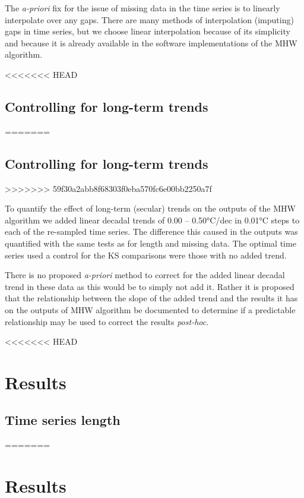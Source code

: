 \documentclass[]{article}
\begin{document}
{The \emph{a-priori} fix for the issue of missing data in the time series
is to linearly interpolate over any gaps. There are many methods of
interpolation (imputing) gaps in time series, but we choose linear
interpolation because of its simplicity and because it is already
available in the software implementations of the MHW algorithm.

<<<<<<< HEAD
\hypertarget{controlling-for-long-term-trends}{%
\subsection{Controlling for long-term
trends}\label{controlling-for-long-term-trends}}
=======
\subsection{Controlling for long-term
trends}\label{controlling-for-long-term-trends}
>>>>>>> 59f30a2abb8f68303f0eba570fc6e00bb2250a7f

To quantify the effect of long-term (secular) trends on the outputs of
the MHW algorithm we added linear decadal trends of 0.00 -- 0.50°C/dec
in 0.01°C steps to each of the re-sampled time series. The difference
this caused in the outputs was quantified with the same tests as for
length and missing data. The optimal time series used a control for the
KS comparisons were those with no added trend.

There is no proposed \emph{a-priori} method to correct for the added
linear decadal trend in these data as this would be to simply not add
it. Rather it is proposed that the relationship between the slope of the
added trend and the results it has on the outputs of MHW algorithm be
documented to determine if a predictable relationship may be used to
correct the results \emph{post-hoc}.

<<<<<<< HEAD
\hypertarget{results}{%
\section{Results}\label{results}}

\hypertarget{time-series-length}{%
\subsection{Time series length}\label{time-series-length}}
=======
\section{Results}\label{results}

}
\end{document}
